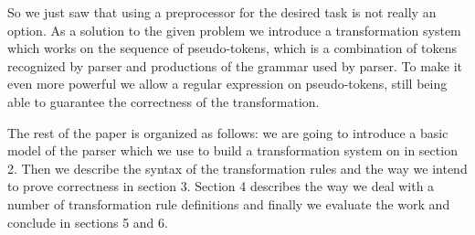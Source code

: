 
So we just saw that using a preprocessor for the desired task is
not really an option. As a solution to the given problem we introduce
a transformation system
which works on the sequence of pseudo-tokens, which is a combination
of tokens recognized by parser and productions of the grammar
used by parser.  To make it even more powerful we allow a 
regular expression on pseudo-tokens, still being able to 
guarantee the correctness of the transformation.

The rest of the paper is organized as follows: we are going to 
introduce a basic model of the parser which we use to build a
transformation system on in section 2.  Then we describe the syntax of
the transformation rules and the way we intend to prove correctness
in section 3.  Section 4 describes the way we deal with a number
of transformation rule definitions and finally we evaluate the work
and conclude in sections 5 and 6.


